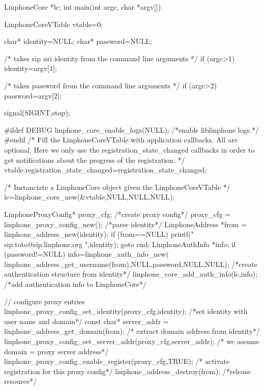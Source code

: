 \begin{DoxyCodeInclude}
LinphoneCore *lc;
int main(int argc, char *argv[]){
        LinphoneCoreVTable vtable={0};

        char* identity=NULL;
        char* password=NULL;

        /* takes   sip uri  identity from the command line arguments */
        if (argc>1){
                identity=argv[1];
        }

        /* takes   password from the command line arguments */
        if (argc>2){
                password=argv[2];
        }

        signal(SIGINT,stop);

#ifdef DEBUG
        linphone_core_enable_logs(NULL); /*enable liblinphone logs.*/
#endif
        /* 
         Fill the LinphoneCoreVTable with application callbacks.
         All are optional. Here we only use the registration_state_changed
       callbacks
         in order to get notifications about the progress of the registration.
         */
        vtable.registration_state_changed=registration_state_changed;

        /*
         Instanciate a LinphoneCore object given the LinphoneCoreVTable
        */
        lc=linphone_core_new(&vtable,NULL,NULL,NULL);

        LinphoneProxyConfig* proxy_cfg;
        /*create proxy config*/
        proxy_cfg = linphone_proxy_config_new();
        /*parse identity*/
        LinphoneAddress *from = linphone_address_new(identity);
        if (from==NULL){
                printf("%
       sip:toto@sip.linphone.org \n",identity);
                goto end;
        }
                LinphoneAuthInfo *info;
                if (password!=NULL){
                        info=linphone_auth_info_new(
      linphone_address_get_username(from),NULL,password,NULL,NULL); /*create
       authentication structure from identity*/
                        linphone_core_add_auth_info(lc,info); /*add
       authentication info to LinphoneCore*/
                }

                // configure proxy entries
                linphone_proxy_config_set_identity(proxy_cfg,identity); /*set
       identity with user name and domain*/
                const char* server_addr = linphone_address_get_domain(from); /*
      extract domain address from identity*/
                linphone_proxy_config_set_server_addr(proxy_cfg,server_addr); 
      /* we assume domain = proxy server address*/
                linphone_proxy_config_enable_register(proxy_cfg,TRUE); /*
      activate registration for this proxy config*/
                linphone_address_destroy(from); /*release resource*/

}
\end{DoxyCodeInclude}
